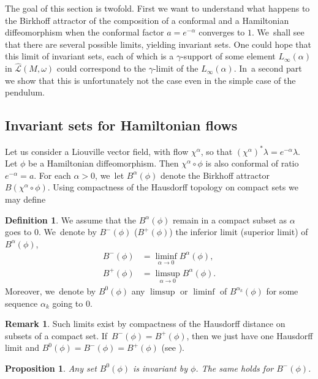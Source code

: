 \documentclass[JEP,XML,SOM,Unicode,NoFloatCountersInSection,published]{cedram}
\newtheorem{prop}[thm]{Proposition}
\theoremstyle{definition}
\newtheorem{defn}[thm]{Definition}
\newtheorem{rem}[thm]{Remark}
\newcommand {\LL}{{\mathcal L}}
\begin{document}
The goal of this section is twofold. First we want to understand what happens to the Birkhoff attractor of the composition of a conformal and a
Hamiltonian diffeomorphism when the conformal factor $a=e^{-\alpha}$ converges to $1$. We~shall see that there are several possible limits, yielding invariant sets. One could hope that this
limit of invariant sets, each of which is a $\gamma$\nobreakdash-support of some element $L_\infty(\alpha)$ in $\widehat{\LL} (M,\omega)$ could correspond to the $\gamma$\nobreakdash-limit of the $L_\infty(\alpha)$. In~a second part we show that this is unfortunately not the case even in the simple case of the pendulum.
\subsection{Invariant sets for Hamiltonian flows}
Let us consider a Liouville vector field, with flow $\chi^\alpha$, so that $(\chi^\alpha)^*\lambda=e^{-\alpha} \lambda$. Let $\phi$ be a Hamiltonian diffeomorphism. Then $\chi^\alpha\circ \phi$ is also conformal of ratio $e^{-\alpha}=a$. For each $\alpha>0$, we~let $B^\alpha(\phi)$ denote the Birkhoff attractor $B(\chi^\alpha\circ \phi)$. Using compactness of the Hausdorff topology on compact sets we may define

\begin{defn} We assume that the $B^\alpha(\phi)$ remain in a compact subset as $\alpha$ goes to $0$. We~denote by $B^-(\phi)$ (\resp $B^+(\phi)$) the inferior limit (\resp superior limit) of $B_{}^\alpha(\phi)$, \ie
\begin{align*}
B^-(\phi)&=\liminf_{\alpha\to 0}B^\alpha(\phi),
\\
B^+(\phi)&=\limsup_{\alpha\to 0}B^\alpha(\phi).
\end{align*}
Moreover, we~denote by $B^0(\phi)$
any $\limsup$ or $\liminf$ of $B^{\alpha_k}(\phi)$ for some sequence $\alpha_k$ going to $0$.
\end{defn}

\begin{rem}
Such limits exist by compactness of the Hausdorff distance on subsets of a compact set. If~$B^-(\phi)=B^+(\phi)$, then
we just have one Hausdorff limit and $B^0(\phi)=B^-(\phi)=B^+(\phi) $ (see \cite[p.\,26, Exer.\,4.23 \& 4.24]{Kechris}).
\end{rem}

\begin{prop} Any set $B^0(\phi)$ is invariant by $\phi$. The same holds for $B^-(\phi)$.
\end{prop}
\end{document}
